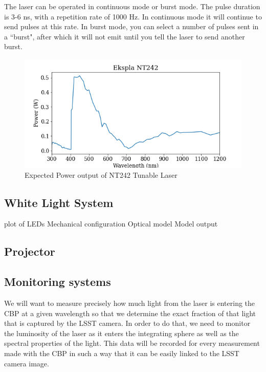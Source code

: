 \documentclass[SE,authoryear,lsstdraft,toc]{lsstdoc}
\begin{document}
The laser can be operated in continuous mode or burst mode. 
The pulse duration is 3-6 ns, with a repetition rate of 1000 Hz. 
In continuous mode it will continue to send pulses at this rate. 
In burst mode, you can select a number of pulses sent in a ``burst", after which it will not emit until you tell the laser to send another burst.

\begin{figure}[h]
    \centering
    \includegraphics[width=\textwidth]{nt242_output.png}
    \caption{Expected Power output of NT242 Tunable Laser}
    \label{fig:laser_power}
\end{figure}


\subsection{White Light System}
plot of LEDs
Mechanical configuration
Optical model
Model output

\subsection{Projector}

\subsection{Monitoring systems}

We will want to measure precisely how much light from the laser is entering the CBP at a given wavelength so that we determine the exact fraction of that light that is captured by the LSST camera. In order to do that, we need to monitor the luminosity of the laser as it enters the integrating sphere as well as the spectral properties of the light. This data will be recorded for every measurement made with the CBP in such a way that it can be easily linked to the LSST camera image. 
\end{document}
